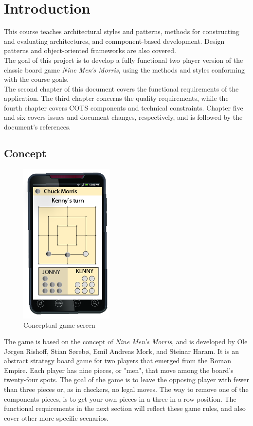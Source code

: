 \section{Introduction}
This course teaches architectural styles and patterns, methods for constructing and evaluating architectures, and comnponent-based development. Design patterns and object-oriented frameworks are also covered. \\

The goal of this project is to develop a fully functional two player version of the classic board game \emph{Nine Men's Morris}, using the methods and styles conforming with the course goals. \\

The second chapter of this document covers the functional requirements of the application. The third chapter concerns the quality requirements, while the fourth chapter covers COTS components and technical constraints. Chapter five and six covers issues and document changes, respectively, and is followed by the document's references.

\subsection{Concept}

\begin{figure}
\vspace{-30pt}
\begin{center}
\includegraphics{concept.png}
\end{center}
\caption{Conceptual game screen}

\end{figure}


The game is based on the concept of \emph{Nine Men's Morris}, and is \newline developed by Ole Jørgen Rishoff, Stian Sørebø, Emil Andreas Mork, and Steinar Haram.
It is an abstract strategy board game for two players that emerged from the Roman Empire. Each player has nine pieces, or "men", that move among the board's twenty-four spots. The goal of the game is to leave the opposing player with fewer than three pieces or, as in checkers, no legal moves. The way to remove one of the components pieces, is to get your own pieces in a three in a row position. The functional requirements in the next section will reflect these game rules, and also cover other more specific scenarios. 



